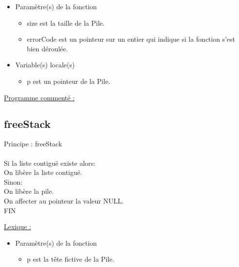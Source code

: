 \documentclass[a4paper]{article}
\newcommand\tab[1][1cm]{\hspace*{#1}}
\begin{document}
\begin{itemize}

\item Paramètre(s) de la fonction  

\begin{itemize}

\item size est la taille de la Pile.

\item errorCode est un pointeur sur un entier qui indique si la fonction s'est bien déroulée.

\end{itemize}

\item Variable(s) locale(s)

\begin{itemize}

\item p est un pointeur de la Pile.
\end{itemize}

\end{itemize}

\underline{Programme commenté :}
\subsection{freeStack}

\begin{algorithm}

Principe : freeStack
\\
\\
\tab Si la liste contiguë existe alors:
\\
\tab \tab On libère la liste contiguë.
\\
\tab  Sinon:
\\ 
\tab \tab  On libère la pile.
\\
\tab On affecter au pointeur la valeur NULL.
\\


FIN
\end{algorithm}
\underline{Lexique :}

\begin{itemize}

\item Paramètre(s) de la fonction  

\begin{itemize}

\item p est la tête fictive de la Pile.

\end{itemize}

\end{itemize}
\end{document}

